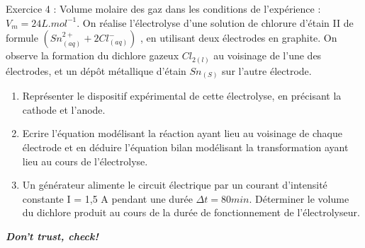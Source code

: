 \documentclass[12pt, french]{article}
\begin{document}
\begin{Box2}{Exercice 4 : }
	Volume molaire des gaz dans les conditions de l’expérience : $V_m = 24 L.mol^{-1}.$
	On réalise l’électrolyse d’une solution de chlorure d’étain II de formule $(Sn^{2+}_{(aq)} + 2Cl^-_{(aq)})$ , en utilisant deux électrodes en graphite. On observe la formation du
	dichlore gazeux  $Cl_{2(l)}$ au voisinage de l’une des électrodes, et un dépôt métallique
	d’étain $Sn_{(S)}$ sur l’autre électrode.
	\begin{enumerate}
		\item  Représenter le dispositif expérimental de cette électrolyse, en précisant la
cathode et l’anode.
\item  Ecrire l’équation modélisant la réaction ayant lieu au voisinage de chaque
électrode et en déduire l’équation bilan modélisant la transformation ayant lieu
au cours de l’électrolyse.
\item  Un générateur alimente le circuit électrique par un courant d’intensité constante
	I = 1,5 A pendant une durée $\Delta{t} = 80 min$.
Déterminer le volume du dichlore produit au cours de la durée de
fonctionnement de l’électrolyseur.
\end{enumerate}
\end{Box2}

\begin{center}
	\emph{\textbf{Don't trust, check!}}
\end{center}











\end{document}
